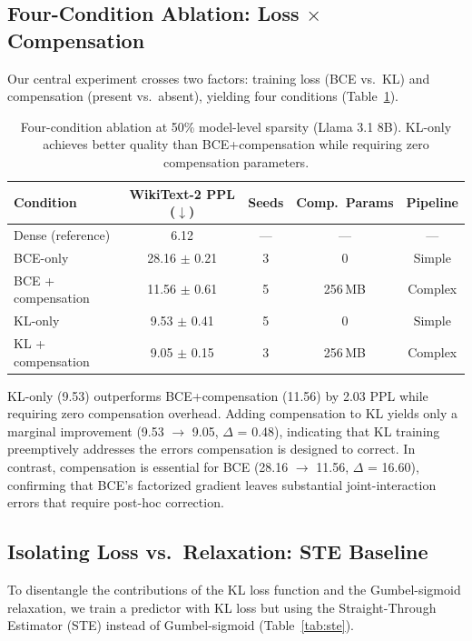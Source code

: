 \documentclass[11pt]{article}
\begin{document}
\subsection{Four-Condition Ablation: Loss $\times$ Compensation}
\label{sec:ablation}

Our central experiment crosses two factors: training loss (BCE vs.\ KL) and compensation (present vs.\ absent), yielding four conditions (Table~\ref{tab:four_cond}).

\begin{table}[t]
\centering
\caption{Four-condition ablation at 50\% model-level sparsity (Llama 3.1 8B). KL-only achieves better quality than BCE+compensation while requiring zero compensation parameters.}
\label{tab:four_cond}
\small
\begin{tabular}{lcccc}
\toprule
Condition & WikiText-2 PPL ($\downarrow$) & Seeds & Comp.\ Params & Pipeline \\
\midrule
Dense (reference) & 6.12 & --- & --- & --- \\
BCE-only & 28.16 $\pm$ 0.21 & 3 & 0 & Simple \\
BCE + compensation & 11.56 $\pm$ 0.61 & 5 & 256\,MB & Complex \\
KL-only & 9.53 $\pm$ 0.41 & 5 & 0 & Simple \\
KL + compensation & 9.05 $\pm$ 0.15 & 3 & 256\,MB & Complex \\
\bottomrule
\end{tabular}
\end{table}

KL-only (9.53) outperforms BCE+compensation (11.56) by 2.03 PPL while requiring zero compensation overhead. Adding compensation to KL yields only a marginal improvement (9.53 $\rightarrow$ 9.05, $\Delta$ = 0.48), indicating that KL training preemptively addresses the errors compensation is designed to correct. In contrast, compensation is essential for BCE (28.16 $\rightarrow$ 11.56, $\Delta$ = 16.60), confirming that BCE's factorized gradient leaves substantial joint-interaction errors that require post-hoc correction.

\subsection{Isolating Loss vs.\ Relaxation: STE Baseline}
\label{sec:ste}

To disentangle the contributions of the KL loss function and the Gumbel-sigmoid relaxation, we train a predictor with KL loss but using the Straight-Through Estimator (STE) instead of Gumbel-sigmoid (Table~\ref{tab:ste}).
\end{document}
